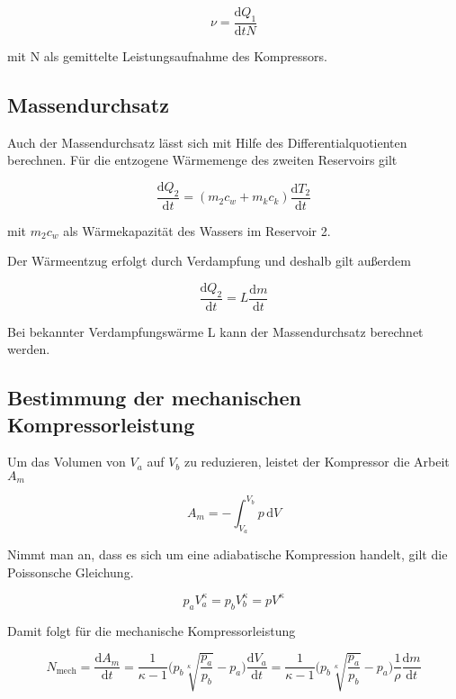 \begin{equation}
ν = \frac{\mathrm{d}Q_{1}}{\mathrm{d}t N}
\end{equation}

mit N als gemittelte Leistungsaufnahme des Kompressors.

\subsection{Massendurchsatz}
Auch der Massendurchsatz lässt sich mit Hilfe des Differentialquotienten berechnen. Für die entzogene Wärmemenge des zweiten Reservoirs gilt

\begin{equation}
\frac{\mathrm{d}Q_{2}}{\mathrm{d}t} = (m_2 c_w + m_kc_k)\frac{\mathrm{d}T_{2}}{\mathrm{d}t}
\end{equation}

mit $m_{2} c_w$ als Wärmekapazität des Wassers im Reservoir 2.

Der Wärmeentzug erfolgt durch Verdampfung und deshalb gilt außerdem

\begin{equation}
\frac{\mathrm{d}Q_{2}}{\mathrm{d}t} = L\frac{\mathrm{d}m}{\mathrm{d}t}
\end{equation}

Bei bekannter Verdampfungswärme L kann der Massendurchsatz berechnet werden.

\subsection{Bestimmung der mechanischen Kompressorleistung}
Um das Volumen von $V_a$ auf $V_b$ zu reduzieren, leistet der Kompressor die Arbeit $A_m$

\begin{equation}
A_m = - \int_{V_a}^{V_b} p \, \mathrm{d}V
\end{equation}

Nimmt man an, dass es sich um eine adiabatische Kompression handelt, gilt die Poissonsche Gleichung.

\begin{equation}
p_a V_a^{\kappa} = p_b V_b^{\kappa} = pV^{\kappa}
\end{equation}

Damit folgt für die mechanische Kompressorleistung


\begin{equation}
N_\text{mech} = \frac{\mathrm{d}A_m}{\mathrm{d}t} = \frac{1}{\kappa -1}\biggl(p_b \sqrt[\kappa]{\frac{p_a}{p_b}}-p_a\biggr)\frac{\mathrm{d}V_a}{\mathrm{d}t} = \frac{1}{\kappa-1}\biggl(p_b \sqrt[\kappa]{\frac{p_a}{p_b}}-p_a\biggr)\frac{1}{\rho} \frac{\mathrm{d}m} {\mathrm{d}t}
\end{equation}

